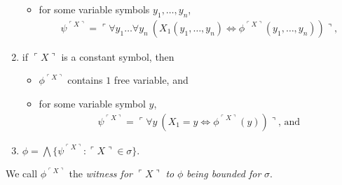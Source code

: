 \documentclass[12pt]{article}
\numberwithin{equation}{section}
\begin{document}
\begin{defi}
\begin{enumerate}[label=(\alph*)]
\begin{itemize}[label=$\circ$, leftmargin=20pt]
        \item for some variable symbols $y_1, \dots, y_n$,
        \begin{align*}
            \psi^{\ulcorner X \urcorner} = \ulcorner \forall y_1 \dots \forall y_n \ (X_1(y_1, \dots, y_n) \iff \phi^{\ulcorner X \urcorner}(y_1, \dots, y_n)) \urcorner \text{,}
        \end{align*}
    \end{itemize}
    \item\label{82165} if $\ulcorner X \urcorner$ is a constant symbol, then 
    \begin{itemize}[label=$\circ$, leftmargin=20pt]
        \item $\phi^{\ulcorner X \urcorner}$ contains $1$ free variable, and
        \item for some variable symbol $y$,
        \begin{align*}
            \psi^{\ulcorner X \urcorner} = \ulcorner \forall y \ (X_1 = y \iff \phi^{\ulcorner X \urcorner}(y)) \urcorner \text{, and}
        \end{align*}
    \end{itemize}
    \item $\phi = \bigwedge \{\psi^{\ulcorner X \urcorner} : \ulcorner X \urcorner \in \sigma\}$.
\end{enumerate}
We call $\phi^{\ulcorner X \urcorner}$ the \emph{witness for} $\ulcorner X \urcorner$ \emph{to} $\phi$ \emph{being bounded for} $\sigma$.
\end{defi}
\end{document}
